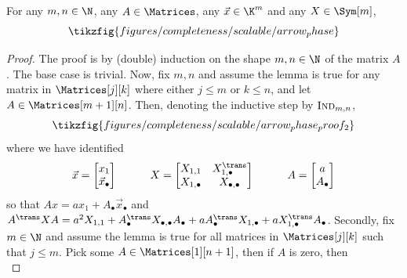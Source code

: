 \begin{lemma}
  \label{lem:scalable_arrow_phase}
  For any \(m,n \in \N\), any \(A \in \Matrices\), any \(\vec x \in \K^m\)
  and any \(X \in \Sym[m]\),
  \begin{equation*}
    \tikzfig{figures/completeness/scalable/arrow_phase}
  \end{equation*}
\end{lemma}
\begin{proof}
  The proof is by (double) induction on the shape \(m,n \in \N\) of the
  matrix \(A\). The base case is trivial.
  Now, fix \(m,n\) and assume the lemma is true for any matrix in
  \(\Matrices[j][k]\) where either \(j \leqslant m\) or \(k
  \leqslant n\), and let \(A \in  \Matrices[m+1][n]\). Then,
  denoting the inductive step by \(\textsc{Ind}_{m,n}\),
  \begin{equation}
    \tikzfig{figures/completeness/scalable/arrow_phase_proof_2}
  \end{equation}
  where we have identified
  \begin{equation}
    \vec x = \begin{bmatrix} x_1 \\ \vec  x_\bullet \end{bmatrix}
    \quad\quad\quad
    X = \begin{bmatrix} X_{1,1} & X_{1,\bullet}^\trans \\ X_{1,\bullet} & X_{\bullet,\bullet} \end{bmatrix}
    \quad\quad\quad
    A = \begin{bmatrix} a \\ A_\bullet \end{bmatrix}
  \end{equation}
  so that \(Ax = ax_1 + A_\bullet \vec x_\bullet\) and \(A^\trans XA =
  a^2 X_{1,1} + A_\bullet^\trans X_{\bullet,\bullet}A_\bullet +
  aA_\bullet^\trans X_{1,\bullet} + aX_{1,\bullet}^\trans A_\bullet\).
  Secondly, fix \(m \in \N\) and assume the lemma is true for all matrices
  in \( \Matrices[j][k]\) such that \(j \leqslant m\). Pick
  some \(A \in  \Matrices[1][n+1]\), then if \(A\) is zero, then
  \begin{equation}

\end{equation}
\end{proof}

